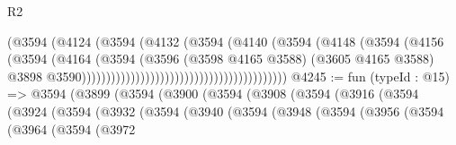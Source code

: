 \begin{lexlean}{R2}
\begin{coremodule}
                                                            (@3594
                                                              (@4124
                                                                (@3594
                                                                  (@4132
                                                                    (@3594
                                                                      (@4140
                                                                        (@3594
                                                                          (@4148
                                                                            (@3594
                                                                              (@4156
                                                                                (@3594
                                                                                  (@4164
                                                                                    (@3594
                                                                                      (@3596
                                                                                        (@3598
                                                                                          @4165
                                                                                          @3588)
                                                                                        (@3605
                                                                                          @4165
                                                                                          @3588)
                                                                                        @3898
                                                                                        @3590))))))))))))))))))))))))))))))))))))))))))
@4245 := fun (typeId : @15) =>
  @3594
    (@3899
      (@3594
        (@3900
          (@3594
            (@3908
              (@3594
                (@3916
                  (@3594
                    (@3924
                      (@3594
                        (@3932
                          (@3594
                            (@3940
                              (@3594
                                (@3948
                                  (@3594
                                    (@3956
                                      (@3594
                                        (@3964
                                          (@3594
                                            (@3972

\end{coremodule}
\end{lexlean}
